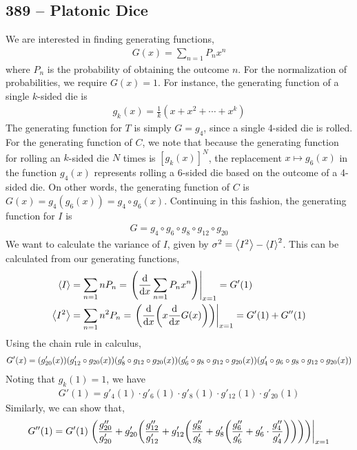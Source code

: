 \documentclass{article}
\begin{document}
\subsection*{389 -- Platonic Dice}
We are interested in finding generating functions,
\begin{align*}
	G(x) = \sum_{n=1} P_n x^n
\end{align*}
where $P_n$ is the probability of obtaining the outcome $n$.
For the normalization of probabilities, we require $G(x) = 1$.
For instance, the generating function of a single $k$-sided die is
\begin{align*}
	g_k(x) = \frac{1}{k}(x + x^2 + \cdots + x^k)
\end{align*}
The generating function for $T$ is simply $G = g_4$, since a single 4-sided die is rolled.
For the generating function of $C$, we note that because the generating function for rolling an $k$-sided die $N$ times is $[g_k(x)]^N$, the replacement $x \mapsto g_6(x)$ in the function $g_4(x)$ represents rolling a 6-sided die based on the outcome of a 4-sided die.
On other words, the generating function of $C$ is $G(x) = g_4(g_6(x)) = g_4 \circ g_6(x)$.
Continuing in this fashion, the generating function for $I$ is
\begin{align*}
	G = g_4 \circ g_6 \circ g_8 \circ g_{12} \circ g_{20}
\end{align*}
We want to calculate the variance of $I$, given by $\sigma^2 = \ev{I^2} - \ev{I}^2$.
This can be calculated from our generating functions,
\begin{align*}
	\ev{I} &= \sum_{n=1} n P_n = \eval{\qty( \dv{x} \sum_{n=1} P_n x^n)}_{x=1} = G'(1) \\
	\ev{I^2} &= \sum_{n=1} n^2 P_n = \eval{\qty(\dv{x} \qty( x \dv{x} G(x) ))}_{x=1} = G'(1) + G''(1) 
\end{align*}
Using the chain rule in calculus,
\begin{align*}
	G'(x) = \qty( g'_{20}(x)) \qty( g'_{12} \circ g_{20}(x))\qty( g'_8 \circ g_{12} \circ g_{20}(x)) \qty( g'_6 \circ g_8 \circ g_{12} \circ g_{20}(x))\qty( g'_4 \circ g_6 \circ g_8 \circ g_{12} \circ g_{20}(x) )
\end{align*}
Noting that $g_k(1) = 1$, we have
\begin{align*} 
	G'(1) = g'_4(1) \cdot g'_6(1) \cdot g'_8(1) \cdot g'_{12}(1) \cdot g'_{20}(1)
\end{align*}
Similarly, we can show that,
\begin{align*}
	G''(1) = G'(1) \eval{\qty( \frac{g''_{20}}{g'_{20}} + g'_{20} \qty(\frac{g''_{12}}{g'_{12}} + g'_{12} \qty(\frac{g''_8}{g'_8} + g'_8 \qty(\frac{g''_6}{g'_6} + g'_6 \cdot \frac{g''_4}{g'_4}))))}_{x=1} 
\end{align*}
\end{document}
